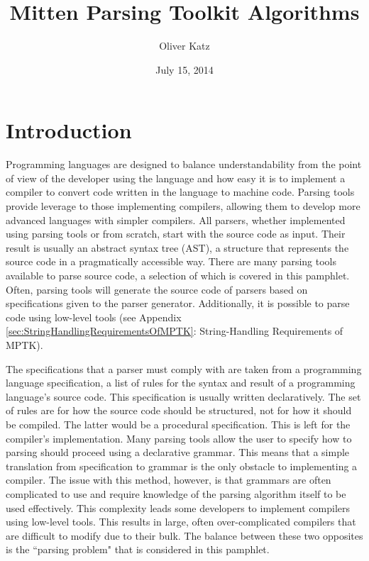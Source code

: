\documentclass[10pt,a4paper]{article}
\title{Mitten Parsing Toolkit Algorithms}
\author{Oliver Katz}
\date{July 15, 2014}
\begin{document}
\maketitle

\tableofcontents

\section{Introduction}

Programming languages are designed to balance understandability from the point of view of the developer using the language and how easy it is to implement a compiler to convert code written in the language to machine code. Parsing tools provide leverage to those implementing compilers, allowing them to develop more advanced languages with simpler compilers.  All parsers, whether implemented using parsing tools or from scratch, start with the source code as input. Their result is usually an abstract syntax tree (AST), a structure that represents the source code in a pragmatically accessible way.  There are many parsing tools available to parse source code, a selection of which is covered in this pamphlet. Often, parsing tools will generate the source code of parsers based on specifications given to the parser generator. Additionally, it is possible to parse code using low-level tools (see Appendix \ref{sec:StringHandlingRequirementsOfMPTK}: String-Handling Requirements of MPTK).

The specifications that a parser must comply with are taken from a programming language specification, a list of rules for the syntax and result of a programming language's source code. This specification is usually written declaratively. The set of rules are for how the source code should be structured, not for how it should be compiled. The latter would be a procedural specification. This is left for the compiler's implementation. Many parsing tools allow the user to specify how to parsing should proceed using a declarative grammar. This means that a simple translation from specification to grammar is the only obstacle to implementing a compiler. The issue with this method, however, is that grammars are often complicated to use and require knowledge of the parsing algorithm itself to be used effectively. This complexity leads some developers to implement compilers using low-level tools. This results in large, often over-complicated compilers that are difficult to modify due to their bulk. The balance between these two opposites is the ``parsing problem" that is considered in this pamphlet.
\end{document}
